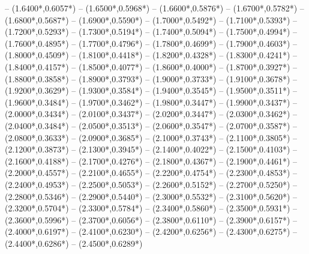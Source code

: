 {	-- ({1.6400*\dx},{0.6057*\dy})
	-- ({1.6500*\dx},{0.5968*\dy})
	-- ({1.6600*\dx},{0.5876*\dy})
	-- ({1.6700*\dx},{0.5782*\dy})
	-- ({1.6800*\dx},{0.5687*\dy})
	-- ({1.6900*\dx},{0.5590*\dy})
	-- ({1.7000*\dx},{0.5492*\dy})
	-- ({1.7100*\dx},{0.5393*\dy})
	-- ({1.7200*\dx},{0.5293*\dy})
	-- ({1.7300*\dx},{0.5194*\dy})
	-- ({1.7400*\dx},{0.5094*\dy})
	-- ({1.7500*\dx},{0.4994*\dy})
	-- ({1.7600*\dx},{0.4895*\dy})
	-- ({1.7700*\dx},{0.4796*\dy})
	-- ({1.7800*\dx},{0.4699*\dy})
	-- ({1.7900*\dx},{0.4603*\dy})
	-- ({1.8000*\dx},{0.4509*\dy})
	-- ({1.8100*\dx},{0.4418*\dy})
	-- ({1.8200*\dx},{0.4328*\dy})
	-- ({1.8300*\dx},{0.4241*\dy})
	-- ({1.8400*\dx},{0.4157*\dy})
	-- ({1.8500*\dx},{0.4077*\dy})
	-- ({1.8600*\dx},{0.4000*\dy})
	-- ({1.8700*\dx},{0.3927*\dy})
	-- ({1.8800*\dx},{0.3858*\dy})
	-- ({1.8900*\dx},{0.3793*\dy})
	-- ({1.9000*\dx},{0.3733*\dy})
	-- ({1.9100*\dx},{0.3678*\dy})
	-- ({1.9200*\dx},{0.3629*\dy})
	-- ({1.9300*\dx},{0.3584*\dy})
	-- ({1.9400*\dx},{0.3545*\dy})
	-- ({1.9500*\dx},{0.3511*\dy})
	-- ({1.9600*\dx},{0.3484*\dy})
	-- ({1.9700*\dx},{0.3462*\dy})
	-- ({1.9800*\dx},{0.3447*\dy})
	-- ({1.9900*\dx},{0.3437*\dy})
	-- ({2.0000*\dx},{0.3434*\dy})
	-- ({2.0100*\dx},{0.3437*\dy})
	-- ({2.0200*\dx},{0.3447*\dy})
	-- ({2.0300*\dx},{0.3462*\dy})
	-- ({2.0400*\dx},{0.3484*\dy})
	-- ({2.0500*\dx},{0.3513*\dy})
	-- ({2.0600*\dx},{0.3547*\dy})
	-- ({2.0700*\dx},{0.3587*\dy})
	-- ({2.0800*\dx},{0.3633*\dy})
	-- ({2.0900*\dx},{0.3685*\dy})
	-- ({2.1000*\dx},{0.3743*\dy})
	-- ({2.1100*\dx},{0.3805*\dy})
	-- ({2.1200*\dx},{0.3873*\dy})
	-- ({2.1300*\dx},{0.3945*\dy})
	-- ({2.1400*\dx},{0.4022*\dy})
	-- ({2.1500*\dx},{0.4103*\dy})
	-- ({2.1600*\dx},{0.4188*\dy})
	-- ({2.1700*\dx},{0.4276*\dy})
	-- ({2.1800*\dx},{0.4367*\dy})
	-- ({2.1900*\dx},{0.4461*\dy})
	-- ({2.2000*\dx},{0.4557*\dy})
	-- ({2.2100*\dx},{0.4655*\dy})
	-- ({2.2200*\dx},{0.4754*\dy})
	-- ({2.2300*\dx},{0.4853*\dy})
	-- ({2.2400*\dx},{0.4953*\dy})
	-- ({2.2500*\dx},{0.5053*\dy})
	-- ({2.2600*\dx},{0.5152*\dy})
	-- ({2.2700*\dx},{0.5250*\dy})
	-- ({2.2800*\dx},{0.5346*\dy})
	-- ({2.2900*\dx},{0.5440*\dy})
	-- ({2.3000*\dx},{0.5532*\dy})
	-- ({2.3100*\dx},{0.5620*\dy})
	-- ({2.3200*\dx},{0.5704*\dy})
	-- ({2.3300*\dx},{0.5784*\dy})
	-- ({2.3400*\dx},{0.5860*\dy})
	-- ({2.3500*\dx},{0.5931*\dy})
	-- ({2.3600*\dx},{0.5996*\dy})
	-- ({2.3700*\dx},{0.6056*\dy})
	-- ({2.3800*\dx},{0.6110*\dy})
	-- ({2.3900*\dx},{0.6157*\dy})
	-- ({2.4000*\dx},{0.6197*\dy})
	-- ({2.4100*\dx},{0.6230*\dy})
	-- ({2.4200*\dx},{0.6256*\dy})
	-- ({2.4300*\dx},{0.6275*\dy})
	-- ({2.4400*\dx},{0.6286*\dy})
	-- ({2.4500*\dx},{0.6289*\dy})
}
